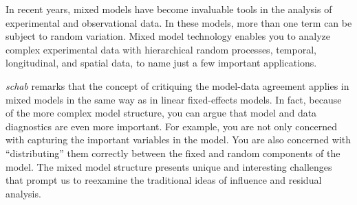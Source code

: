 \documentclass[12pt, a4paper]{report}
\theoremstyle{plain}
\theoremstyle{definition}
\theoremstyle{remark}
\begin{document}
In recent years, mixed models have become invaluable tools in the analysis of experimental and observational
data. In these models, more than one term can be subject to random variation. Mixed model
technology enables you to analyze complex experimental data with hierarchical random processes, temporal,
longitudinal, and spatial data, to name just a few important applications. 
%

\emph{schab} remarks that the concept of critiquing the model-data agreement applies in mixed models in the same way as in linear
fixed-effects models. In fact, because of the more complex model structure, you can argue that model and
data diagnostics are even more important. For example, you are not only concerned with capturing the
important variables in the model. You are also concerned with ``distributing” them correctly between the
fixed and random components of the model. The mixed model structure presents unique and interesting
challenges that prompt us to reexamine the traditional ideas of influence and residual analysis.
\end{document}
